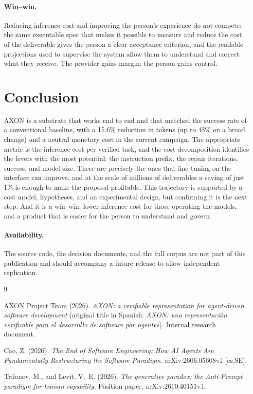 \documentclass[11pt, a4paper]{article}
\newcommand{\pc}{\%}
\begin{document}
\paragraph{Win--win.} Reducing inference cost and improving the person's experience do not compete: the same executable spec that makes it possible to measure and reduce the cost of the deliverable gives the person a clear acceptance criterion, and the readable projections used to supervise the system allow them to understand and correct what they receive. The provider gains margin; the person gains control.

\section{Conclusion}

AXON is a substrate that works end to end and that matched the success rate of a conventional baseline, with a 15.6\pc{} reduction in tokens (up to 43\pc{} on a broad change) and a neutral monetary cost in the current campaign. The appropriate metric is the inference cost per verified task, and the cost decomposition identifies the levers with the most potential: the instruction prefix, the repair iterations, success, and model size. These are precisely the ones that fine-tuning on the interface can improve, and at the scale of millions of deliverables a saving of just 1\pc{} is enough to make the proposal profitable. This trajectory is supported by a cost model, hypotheses, and an experimental design, but confirming it is the next step. And it is a win--win: lower inference cost for those operating the models, and a product that is easier for the person to understand and govern.

\paragraph{Availability.} The source code, the decision documents, and the full corpus are not part of this publication and should accompany a future release to allow independent replication.

\begin{thebibliography}{9}

AXON Project Team (2026).
\textit{AXON: a verifiable representation for agent-driven software development} (original title in Spanish: \textit{AXON: una representación verificable para el desarrollo de software por agentes}). Internal research document.

Cao, Z. (2026).
\textit{The End of Software Engineering: How AI Agents Are Fundamentally Restructuring the Software Paradigm}. arXiv:2606.05608v1 [cs.SE].

Trifonov, M., and Levit, V.~E. (2026).
\textit{The generative paradox: the Anti-Prompt paradigm for human capability}. Position paper. arXiv:2610.40151v1.

\end{thebibliography}
\end{document}
